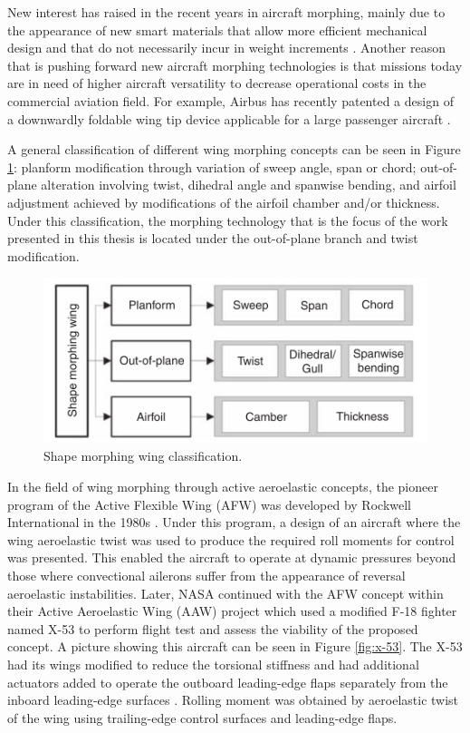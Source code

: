   New interest has raised in the recent years in aircraft morphing, mainly due to the appearance of new smart materials that allow more efficient mechanical design and that do not necessarily incur in weight increments \cite{Lloyd2007}. Another reason that is pushing forward new aircraft morphing technologies is that missions today are in need of higher aircraft versatility to decrease operational costs in the commercial aviation field. For example, Airbus has recently patented a design of a downwardly foldable wing tip device applicable for a large passenger aircraft \cite{Boye2015}.

  A general classification of different wing morphing concepts can be seen in Figure \ref{fig:morphingTypes}: planform modification through variation of sweep angle, span or chord; out-of-plane alteration involving twist, dihedral angle and spanwise bending, and airfoil adjustment achieved by modifications of the airfoil chamber and/or thickness. Under this classification, the morphing technology that is the focus of the work presented in this thesis is located under the out-of-plane branch and twist modification.

  \begin{figure}[!htpb]
    \centering
    \includegraphics[width=0.8 \textwidth]{figures/state-of-the-art/morphingTypes}
    \caption[Shape morphing wing classification]{Shape morphing wing classification. \cite{Barbarino2011}}\label{fig:morphingTypes}
  \end{figure}

  In the field of wing morphing through active aeroelastic concepts, the pioneer program of the Active Flexible Wing (AFW) was developed by Rockwell International in the 1980s \cite{Rockwell}. Under this program, a design of an aircraft where the wing aeroelastic twist was used to produce the required roll moments for control was presented. This enabled the aircraft to operate at dynamic pressures beyond those where convectional ailerons suffer from the appearance of reversal aeroelastic instabilities. Later, NASA continued with the AFW concept within their Active Aeroelastic Wing (AAW) project which used a modified F-18 fighter named X-53 to perform flight test and assess the viability of the proposed concept. A picture showing this aircraft can be seen in Figure \ref{fig:x-53}. The X-53 had its wings modified to reduce the torsional stiffness and had additional actuators added to operate the outboard leading-edge flaps separately from the inboard leading-edge surfaces \cite{NASA}. Rolling moment was obtained by aeroelastic twist of the wing using trailing-edge control surfaces and leading-edge flaps.

